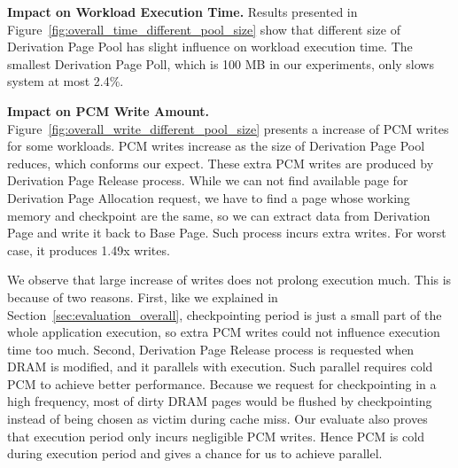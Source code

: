 \documentclass[conference]{IEEEtran}
\begin{document}
\textbf{Impact on Workload Execution Time.}
Results presented in Figure~\ref{fig:overall_time_different_pool_size} show that different size of Derivation Page Pool has slight influence on workload execution time.
The smallest Derivation Page Poll, which is 100 MB in our experiments, only slows system at most 2.4\%.

\textbf{Impact on PCM Write Amount.}
Figure~\ref{fig:overall_write_different_pool_size} presents a increase of PCM writes for some workloads.
PCM writes increase as the size of Derivation Page Pool reduces, which conforms our expect.
These extra PCM writes are produced by Derivation Page Release process.
While we can not find available page for Derivation Page Allocation request, we have to find a page whose working memory and checkpoint are the same, so we can extract data from Derivation Page and write it back to Base Page.
Such process incurs extra writes.
For worst case, it produces 1.49x writes.

We observe that large increase of writes does not prolong execution much.
This is because of two reasons.
First, like we explained in Section~\ref{sec:evaluation_overall}, checkpointing period is just a small part of the whole application execution, so extra PCM writes could not influence execution time too much.
Second, Derivation Page Release process is requested when DRAM is modified, and it parallels with execution.
Such parallel requires cold PCM to achieve better performance.
Because we request for checkpointing in a high frequency, most of dirty DRAM pages would be flushed by checkpointing instead of being chosen as victim during cache miss.
Our evaluate also proves that execution period only incurs negligible PCM writes.
Hence PCM is cold during execution period and gives a chance for us to achieve parallel.

\end{document}
